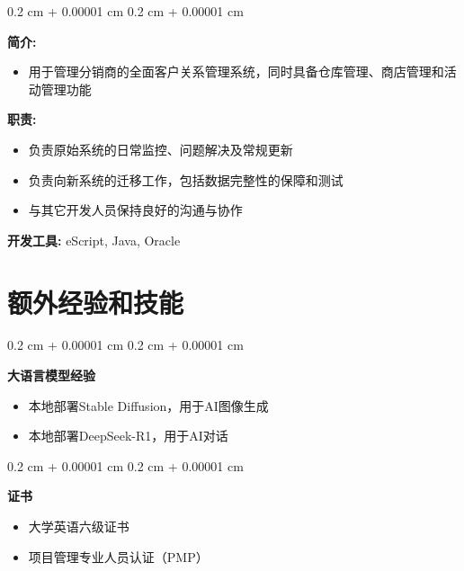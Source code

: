 \documentclass[10pt, letterpaper]{article}
\newenvironment{highlights}{
	\begin{itemize}[
		topsep=0.10 cm,
		parsep=0.10 cm,
		partopsep=0pt,
		itemsep=0pt,
		leftmargin=0.4 cm + 10pt
		]
	}{
	\end{itemize}
} %
\newenvironment{onecolentry}{
	\begin{adjustwidth}{
			0.2 cm + 0.00001 cm
		}{
			0.2 cm + 0.00001 cm
		}
	}{
	\end{adjustwidth}
} %
\begin{document}
			\vspace{0.10 cm}
			\begin{onecolentry}
				\textbf{简介:} 
				\begin{highlights}
					\item{用于管理分销商的全面客户关系管理系统，同时具备仓库管理、商店管理和活动管理功能}
				\end{highlights} 
				\textbf{职责:} 
				\begin{highlights}
					\item{负责原始系统的日常监控、问题解决及常规更新}
					\item{负责向新系统的迁移工作，包括数据完整性的保障和测试}
					\item{与其它开发人员保持良好的沟通与协作}
				\end{highlights}
				\textbf{开发工具:} eScript, Java, Oracle 
			\end{onecolentry}
			\vspace{0.4 cm}
			\vspace{0.4 cm}
			
			\section{额外经验和技能}
			\vspace{0.1 cm}
			\begin{onecolentry}
				\textbf{大语言模型经验}
				\begin{highlights}
					\item {本地部署Stable Diffusion，用于AI图像生成}
					\item {本地部署DeepSeek-R1，用于AI对话}
				\end{highlights}
			\end{onecolentry}
			
			\vspace{0.2 cm}
			
			\begin{onecolentry}
				\textbf{证书} 
				\begin{highlights}
					\item {大学英语六级证书}
					\item {项目管理专业人员认证（PMP）}
				\end{highlights}
			\end{onecolentry}
			
			
			
			
\end{document}
